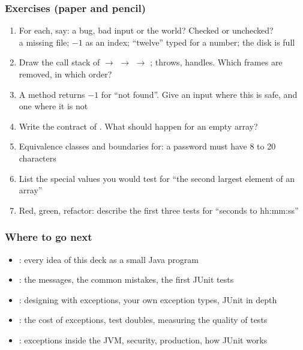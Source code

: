 \documentclass[aspectratio=169,10pt,compress]{beamer}
\begin{document}
\begin{frame}[t,fragile] \frametitle{Exercises (paper and pencil)}
	\begin{enumerate}\small
		\item For each, say: a bug, bad input or the world? Checked or unchecked? \\
			  a missing file; $-1$ as an index; ``twelve'' typed for a number; the disk is full
		\item Draw the call stack of  $\to$  $\to$  $\to$ \hCode{c};  throws,  handles.
			  Which frames are removed, in which order?
		\item A method returns $-1$ for ``not found''. Give an input where this is safe, and one where it is not
		\item Write the contract of . What should happen for an empty array?
		\item Equivalence classes and boundaries for: a password must have 8 to 20 characters
		\item List the special values you would test for ``the second largest element of an array''
		\item Red, green, refactor: describe the first three tests for ``seconds to hh:mm:ss''
	\end{enumerate}
\end{frame}




\begin{frame}[t,fragile] \frametitle{Where to go next}
	\begin{itemize}\small
		\item {}: every idea of this deck as a small Java program
		\item {}: the messages, the common mistakes, the first JUnit tests
		\item {}: designing with exceptions, your own exception types, JUnit in depth
		\item {}: the cost of exceptions, test doubles, measuring the quality of tests
		\item {}: exceptions inside the JVM, security, production, how JUnit works
	\end{itemize}
\end{frame}
\end{document}
